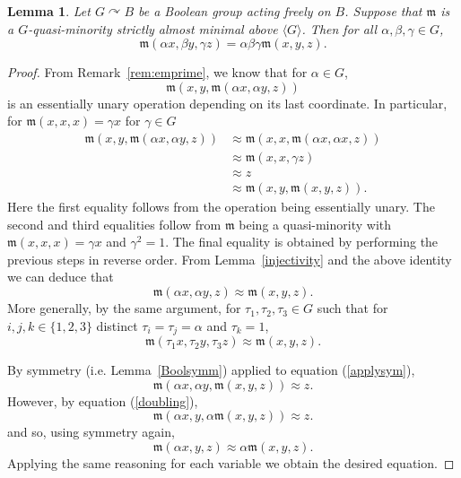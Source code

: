 \documentclass{article}
\newtheorem{lemma}[theorem]{Lemma}
\theoremstyle{remark}
\theoremstyle{definition}
\def\acts{\curvearrowright}
\begin{document}
\begin{lemma}\label{twistingaround} Let $G\acts B$ be a Boolean group acting freely on $B$. Suppose that $\mathfrak{m}$ is a $G$-quasi-minority strictly almost minimal above $\langle G\rangle$. Then for all $\alpha, \beta, \gamma\in G$,
\[\mathfrak{m}(\alpha x, \beta y, \gamma z)=\alpha\beta\gamma \mathfrak{m}(x,y,z).\]    
\end{lemma}
\begin{proof} From Remark~\ref{rem:emprime}, we know that for $\alpha\in G$,
\[\mathfrak{m}(x,y,\mathfrak{m}(\alpha x, \alpha y, z))\]
is an essentially unary operation depending on its last coordinate. In particular, for $\mathfrak{m}(x,x,x)=\gamma x$ for $\gamma\in G$
\begin{align*}
\mathfrak{m}(x,y,\mathfrak{m}(\alpha x, \alpha y, z)) &\approx \mathfrak{m}(x,x,\mathfrak{m}(\alpha x, \alpha x, z))\\
& \approx \mathfrak{m}(x,x,\gamma z)\\
& \approx z\\
&\approx  \mathfrak{m}(x,y,\mathfrak{m}(x, y, z)). 
\end{align*}
Here the first equality follows from the operation being essentially unary. The second and third equalities follow from $\mathfrak{m}$ being a quasi-minority with $\mathfrak{m}(x,x,x)=\gamma x$ and $\gamma^2=1$. The final equality is obtained by performing the previous steps in reverse order. 
From Lemma~\ref{injectivity} and the above identity we can deduce that
\begin{equation}\label{applysym}
    \mathfrak{m}(\alpha x, \alpha y, z)\approx \mathfrak{m}(x, y, z).
\end{equation}
More generally, by the same argument, for $\tau_1, \tau_2, \tau_3\in G$ such that for $i, j, k\in\{1,2,3\}$ distinct $\tau_i=\tau_j=\alpha$ and $\tau_k=1$,
\begin{equation}\label{doubling}
   \mathfrak{m}(\tau_1 x, \tau_2 y, \tau_3 z)\approx \mathfrak{m}(x, y, z).
\end{equation}

By symmetry (i.e. Lemma~\ref{Boolsymm}) applied to equation (\ref{applysym}), 
\[\mathfrak{m}(\alpha x, \alpha y, \mathfrak{m}(x, y, z))\approx z.\]
However, by equation (\ref{doubling}),
\[\mathfrak{m}(\alpha x, y, \alpha \mathfrak{m}(x, y, z))\approx z.\]
and so, using symmetry again,
\[\mathfrak{m}(\alpha x, y, z)\approx \alpha \mathfrak{m}(x, y, z).\]
Applying the same reasoning for each variable we obtain the desired equation.  
\end{proof}
\end{document}
